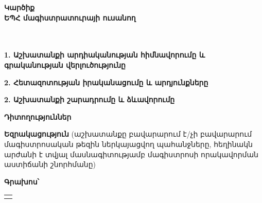 \documentclass[12pt]{article}
\newcommand{\undertextline}[2]{ {
\renewcommand{\arraystretch}{0.7}
\begin{tabular}{p{#2cm}}
\\
\hline
\centering{{\fontsize{8pt}{8pt} \textit{#1}}}
\end{tabular}} }
\begin{document}
\newtheorem{theorem}{Թեորեմ}
\newtheorem{lemma}{Լեմմա}
\newtheorem{corollary}{Հետևանք}
\newtheorem{preposition}{Պնդում}
\newtheorem{defination}{Սահմանում}
\newtheorem{remark}{Դիտողություն}
\newtheorem*{remark*}{Դիտողություն}


\theoremstyle{definition} %
\newtheorem{innercustomcase}{Դեպք}
\newenvironment{customcase}[1]
  {\renewcommand\theinnercustomcase{#1}\innercustomcase}
  {\endinnercustomcase}
\newtheorem{case}{Դեպք}



{
\begin{center}
{\fontsize{18pt}{18pt} \selectfont \textbf{Կարծիք}}\\
\vspace{10mm}
{\fontsize{14pt}{14pt} \selectfont \textbf{ԵՊՀ մագիստրատուրայի ուսանող}}\\
{\fontsize{13pt}{13pt} }\\
{\fontsize{13pt}{13pt} }\\
{\fontsize{13pt}{13pt} }
\end{center}

\vspace{10mm}

{\fontsize{11pt}{11pt} {\textbf{1. Աշխատանքի արդիականության հիմնավորումը և գրականության վերլուծությունը}}\\


{\fontsize{11pt}{11pt} {\textbf{2. Հետազոտության իրականացումը և արդյունքները}}\\

{\fontsize{11pt}{11pt} {\textbf{2. Աշխատանքի շարադրումը և ձևավորումը}}\\


\pagebreak

{\fontsize{13pt}{13pt} {\textbf{Դիտողություններ}}\\

{\fontsize{13pt}{13pt} {\textbf{Եզրակացություն}} (աշխատանքը բավարարում է/չի բավարարում մագիստրոսական թեզին
ներկայացվող պահանջները, հեղինակն արժանի է տվյալ մասնագիտությամբ մագիստրոսի
որակավորման աստիճանի շնորհմանը) \\

{\fontsize{13pt}{13pt} {\textbf{Գրախոս՝}}


\large{\undertextline{(ազգանուն, անուն, հայրանուն)}{12} \hspace{0.3cm} \hspace{0.3cm}  {\fontsize{13pt}{13pt}\\

}}}}}}}}}
\end{document}
